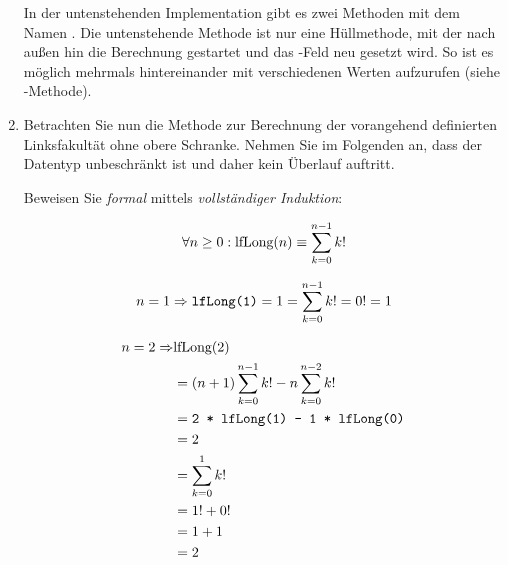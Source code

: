 \documentclass{bschlangaul-aufgabe}
\begin{document}
\begin{enumerate}
\begin{liAntwort}
In der untenstehenden Implementation gibt es zwei Methoden mit dem Namen
. Die untenstehende Methode ist nur eine Hüllmethode, mit
der nach außen hin die Berechnung gestartet und das
-Feld neu gesetzt wird. So ist es möglich
 mehrmals hintereinander mit verschiedenen Werten
aufzurufen (siehe -Methode).

\end{liAntwort}


\item Betrachten Sie nun die Methode  zur
Berechnung der vorangehend definierten Linksfakultät ohne obere
Schranke. Nehmen Sie im Folgenden an, dass der Datentyp
 unbeschränkt ist und daher kein Überlauf auftritt.


Beweisen Sie \emph{formal} mittels \emph{vollständiger Induktion}:

\begin{displaymath}
\forall n \geq 0: \text{lfLong}(n) \equiv \sum^{n - 1}_{k=0}k!
\end{displaymath}

\begin{liAntwort}

%

\liInduktionAnfang

\begin{displaymath}
n=1 \Rightarrow
\texttt{\text{lfLong}(1)} =
1 =
\sum^{n - 1}_{k=0}k! =
0! =
1
\end{displaymath}

\begin{equation*}
\begin{split}
n=2 \Rightarrow & \text{lfLong}(2)\\
& = (n + 1) \sum^{n - 1}_{k=0}k! - n \sum^{n-2}_{k=0}k! \\
& = \texttt{2 * \text{lfLong}(1) - 1 * \text{lfLong}(0)} \\
& = 2 \\
& = \sum^{1}_{k=0}k! \\
& = 1! + 0! \\
& = 1 + 1 \\
& = 2
\end{split}
\end{equation*}

%

\liInduktionVoraussetzung


\end{liAntwort}
\end{enumerate}
\end{document}

